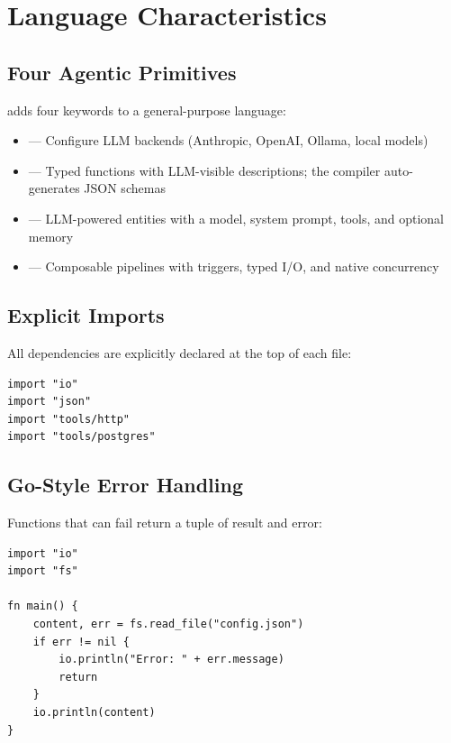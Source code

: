 \section{Language Characteristics}

\subsection{Four Agentic Primitives}

\haira{} adds four keywords to a general-purpose language:

\begin{itemize}
    \item {} --- Configure LLM backends (Anthropic, OpenAI, Ollama, local models)
    \item {} --- Typed functions with LLM-visible descriptions; the compiler auto-generates JSON schemas
    \item {} --- LLM-powered entities with a model, system prompt, tools, and optional memory
    \item {} --- Composable pipelines with triggers, typed I/O, and native concurrency
\end{itemize}

\subsection{Explicit Imports}

All dependencies are explicitly declared at the top of each file:

\begin{lstlisting}
import "io"
import "json"
import "tools/http"
import "tools/postgres"
\end{lstlisting}

\subsection{Go-Style Error Handling}

Functions that can fail return a tuple of result and error:

\begin{lstlisting}
import "io"
import "fs"

fn main() {
    content, err = fs.read_file("config.json")
    if err != nil {
        io.println("Error: " + err.message)
        return
    }
    io.println(content)
}
\end{lstlisting}


